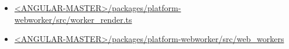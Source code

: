 \begin{itemize}
  \item \href{https://github.com/angular/angular/blob/master/packages/platform-webworker/src/worker_render.ts}
        {<ANGULAR-MASTER>/packages/platform-webworker/src/worker\_render.ts}
\end{itemize}






\begin{itemize}
  \item \href{https://github.com/angular/angular/tree/master/packages/platform-webworker/src/web_workers}
        {<ANGULAR-MASTER>/packages/platform-webworker/src/web\_workers}
\end{itemize}













